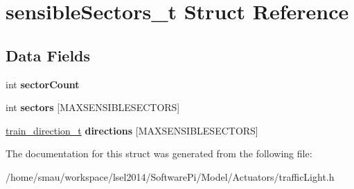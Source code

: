 \hypertarget{structsensibleSectors__t}{\section{sensible\-Sectors\-\_\-t Struct Reference}
\label{structsensibleSectors__t}
}
\subsection*{Data Fields}
\begin{DoxyCompactItemize}
\item 
\hypertarget{structsensibleSectors__t_a8ae66ee90dffc1f5534b90399c4c672b}{int {\bfseries sector\-Count}}\label{structsensibleSectors__t_a8ae66ee90dffc1f5534b90399c4c672b}

\item 
\hypertarget{structsensibleSectors__t_a7ef6940f1378aaf4c43da91eba0a33e9}{int {\bfseries sectors} \mbox{[}M\-A\-X\-S\-E\-N\-S\-I\-B\-L\-E\-S\-E\-C\-T\-O\-R\-S\mbox{]}}\label{structsensibleSectors__t_a7ef6940f1378aaf4c43da91eba0a33e9}

\item 
\hypertarget{structsensibleSectors__t_a21e66de1e49eb93d91400a9222b02a94}{\hyperlink{group__train__t__structs_gae1037d4e4a5a1fe1c4bbe139091ef3a2}{train\-\_\-direction\-\_\-t} {\bfseries directions} \mbox{[}M\-A\-X\-S\-E\-N\-S\-I\-B\-L\-E\-S\-E\-C\-T\-O\-R\-S\mbox{]}}\label{structsensibleSectors__t_a21e66de1e49eb93d91400a9222b02a94}

\end{DoxyCompactItemize}


The documentation for this struct was generated from the following file\-:\begin{DoxyCompactItemize}
\item 
/home/smau/workspace/lsel2014/\-Software\-Pi/\-Model/\-Actuators/traffic\-Light.\-h\end{DoxyCompactItemize}
